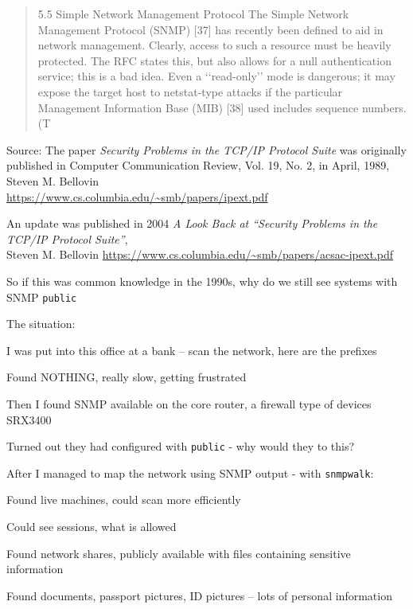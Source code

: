 \documentclass[Screen16to9,17pt]{foils}
\begin{document}
\begin{quote}
5.5 Simple Network Management Protocol
The Simple Network Management Protocol (SNMP) [37] has recently been defined to aid in network
management. Clearly, access to such a resource must be heavily protected. The RFC states this, but
also allows for a null authentication service; this is a bad idea. Even a ‘‘read-only’’ mode is dangerous;
it may expose the target host to netstat-type attacks if the particular Management Information Base
(MIB) [38] used includes sequence numbers. (T
\end{quote}
Source: The paper \emph{Security Problems in the TCP/IP Protocol Suite} was originally\\
published in Computer Communication Review, Vol. 19, No. 2, in April, 1989, Steven M. Bellovin\\
\url{https://www.cs.columbia.edu/~smb/papers/ipext.pdf}

An update was published in 2004
\emph{A Look Back at “Security Problems in the TCP/IP Protocol Suite”}, \\
Steven M. Bellovin
\url{https://www.cs.columbia.edu/~smb/papers/acsac-ipext.pdf}

So if this was common knowledge in the 1990s, why do we still see systems with SNMP \verb+public+

The situation:
\begin{list2}
\item I was put into this office at a bank -- scan the network, here are the prefixes
\item Found NOTHING, really slow, getting frustrated
\item Then I found SNMP available on the core router, a firewall type of devices SRX3400
\item Turned out they had configured with \verb+public+ - why would they to this?
\end{list2}


After I managed to map the network using SNMP output - with \verb+snmpwalk+:
\begin{list2}
\item Found live machines, could scan more efficiently
\item Could see sessions, what is allowed
\item Found network shares, publicly available with files containing sensitive information
\item Found documents, passport pictures, ID pictures -- lots of personal information
\end{list2}
\end{document}
